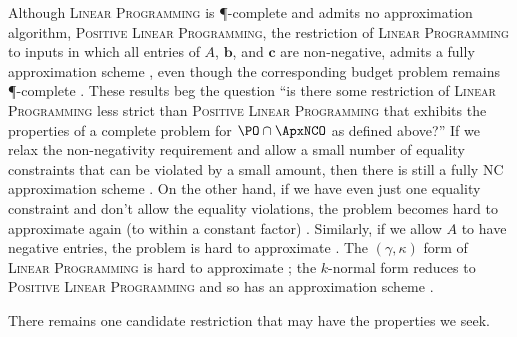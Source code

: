\documentclass[]{article}
\begin{document}
Although \textsc{Linear Programming} is \P-complete and admits no \NC{} approximation algorithm, \textsc{Positive Linear Programming}, the restriction of \textsc{Linear Programming} to inputs in which all entries of $A$, $\mathbf{b}$, and $\mathbf{c}$ are non-negative, admits a fully \NC{} approximation scheme \cite{ln93}, even though the corresponding budget problem remains \P-complete \cite[Theorem~4]{tx98}.
These results beg the question ``is there some restriction of \textsc{Linear Programming} less strict than \textsc{Positive Linear Programming} that exhibits the properties of a complete problem for $\PO \cap \ApxNCO$ as defined above?''
If we relax the non-negativity requirement and allow a small number of equality constraints that can be violated by a small amount, then there is still a fully NC approximation scheme \cite[Theorem~5.2]{tx98}.
On the other hand, if we have even just one equality constraint and don't allow the equality violations, the problem becomes hard to approximate again (to within a constant factor) \cite[Theorem~3.1]{es99} \cite[Remark~2]{tx98}.
Similarly, if we allow $A$ to have negative entries, the problem is hard to approximate \cite[Corollary~2]{efraimidis08}.
The $(\gamma, \kappa)$ form of \textsc{Linear Programming} is hard to approximate \cite[Proposition~1]{efraimidis08}; the $k$-normal form reduces to \textsc{Positive Linear Programming} and so has an approximation scheme \cite[Theorem~2]{trevisan00}.

There remains one candidate restriction that may have the properties we seek.
\end{document}
